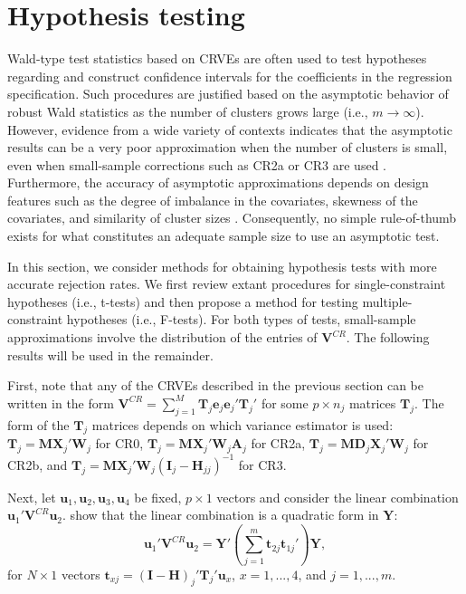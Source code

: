 \documentclass[12pt]{article}\usepackage[]{graphicx}\usepackage[]{color}
\newcommand{\bm}{\mathbf}
\begin{document}
\section{Hypothesis testing}
\label{sec:testing}

Wald-type test statistics based on CRVEs are often used to test hypotheses regarding and construct confidence intervals for the coefficients in the regression specification. 
Such procedures are justified based on the asymptotic behavior of robust Wald statistics as the number of clusters grows large (i.e., $m \to \infty$). 
However, evidence from a wide variety of contexts indicates that the asymptotic results can be a very poor approximation when the number of clusters is small, even when small-sample corrections such as CR2a or CR3 are used \citep{Bell2002bias, Bertrand2004how, Cameron2008bootstrap}. 
Furthermore, the accuracy of asymptotic approximations depends on design features such as the degree of imbalance in the covariates, skewness of the covariates, and similarity of cluster sizes \citep{McCaffrey2001generalizations, Tipton2015small, Webb2013wild}. 
Consequently, no simple rule-of-thumb exists for what constitutes an adequate sample size to use an asymptotic test. 

In this section, we consider methods for obtaining hypothesis tests with more accurate rejection rates. 
We first review extant procedures for single-constraint hypotheses (i.e., t-tests) and then propose a method for testing multiple-constraint hypotheses (i.e., F-tests). 
For both types of tests, small-sample approximations involve the distribution of the entries of $\bm{V}^{CR}$. 
The following results will be used in the remainder. 

First, note that any of the CRVEs described in the previous section can be written in the form $\bm{V}^{CR} = \sum_{j=1}^M \bm{T}_j \bm{e}_j \bm{e}_j' \bm{T}_j'$ for some $p \times n_j$ matrices $\bm{T}_j$. 
The form of the $\bm{T}_j$ matrices depends on which variance estimator is used: $\bm{T}_j = \bm{M}\bm{X}_j' \bm{W}_j$ for CR0, $\bm{T}_j = \bm{M} \bm{X}_j' \bm{W}_j \bm{A}_j$ for CR2a, $\bm{T}_j = \bm{M} \bm{D}_j \bm{X}_j' \bm{W}_j$ for CR2b, and $\bm{T}_j = \bm{M} \bm{X}_j' \bm{W}_j \left(\bm{I}_j - \bm{H}_{jj}\right)^{-1}$ for CR3.

Next, let $\bm{u}_1,\bm{u}_2,\bm{u}_3,\bm{u}_4$ be fixed, $p \times 1$ vectors and consider the linear combination $\bm{u}_1' \bm{V}^{CR} \bm{u}_2$. 
\citet[Theorem 4]{Bell2002bias} show that the linear combination is a quadratic form in $\bm{Y}$: \[
\bm{u}_1' \bm{V}^{CR} \bm{u}_2 = \bm{Y}'\left(\sum_{j=1}^m \bm{t}_{2j} \bm{t}_{1j}'\right) \bm{Y}, \]
for $N \times 1$ vectors $\bm{t}_{xj} = \left(\bm{I} - \bm{H}\right)_j' \bm{T}_j' \bm{u}_x$, $x = 1,...,4$, and $j = 1,...,m$. 
\end{document}
